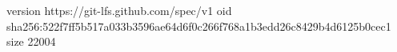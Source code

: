 version https://git-lfs.github.com/spec/v1
oid sha256:522f7ff5b517a033b3596ae64d6f0c266f768a1b3edd26c8429b4d6125b0cec1
size 22004
